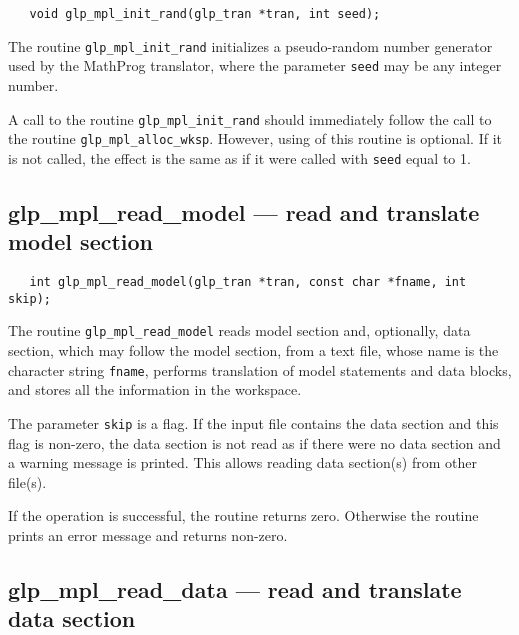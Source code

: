 \synopsis

\begin{verbatim}
   void glp_mpl_init_rand(glp_tran *tran, int seed);
\end{verbatim}

\description

The routine \verb|glp_mpl_init_rand| initializes a pseudo-random number
generator used by the MathProg translator, where the parameter
\verb|seed| may be any integer number.

A call to the routine \verb|glp_mpl_init_rand| should immediately
follow the call to the routine \verb|glp_mpl_alloc_wksp|. However,
using of this routine is optional. If it is not called, the effect is
the same as if it were called with \verb|seed| equal to 1.

\subsection{glp\_mpl\_read\_model --- read and translate model section}

\synopsis

\begin{verbatim}
   int glp_mpl_read_model(glp_tran *tran, const char *fname, int skip);
\end{verbatim}

\description

The routine \verb|glp_mpl_read_model| reads model section and,
optionally, data section, which may follow the model section, from a
text file, whose name is the character string \verb|fname|, performs
translation of model statements and data blocks, and stores all the
information in the workspace.

The parameter \verb|skip| is a flag. If the input file contains the
data section and this flag is non-zero, the data section is not read as
if there were no data section and a warning message is printed. This
allows reading data section(s) from other file(s).

\returns

If the operation is successful, the routine returns zero. Otherwise
the routine prints an error message and returns non-zero.

\newpage

\subsection{glp\_mpl\_read\_data --- read and translate data section}

